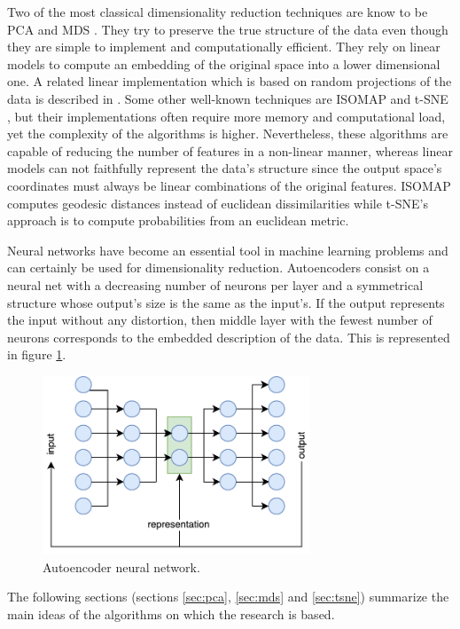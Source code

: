 \documentclass[a4paper,11pt,spanish]{report}
\begin{document}
Two of the most classical dimensionality reduction techniques are know to be PCA \citep{pca} and MDS \citep{mds}. They try to preserve the true structure of the data even though they are simple to implement and computationally efficient. They rely on linear models to compute an embedding of the original space into a lower dimensional one. A related linear implementation which is based on random projections of the data is described in \citep{rproj, rproj2}. Some other well-known techniques are ISOMAP \citep{isomap} and t-SNE \citep{tsne}, but their implementations often require more memory and computational load, yet the complexity of the algorithms is higher. Nevertheless, these algorithms are capable of reducing the number of features in a non-linear manner, whereas linear models can not faithfully represent the data's structure since the output space's coordinates must always be linear combinations of the original features. ISOMAP computes geodesic distances instead of euclidean dissimilarities while t-SNE's approach is to compute probabilities from an euclidean metric.

Neural networks have become an essential tool in machine learning problems and can certainly be used for dimensionality reduction. Autoencoders \citep{auto2, auto} consist on a neural net with a  decreasing number of neurons per layer and a symmetrical structure whose output's size is the same as the input's. If the output represents the input without any distortion, then middle layer with the fewest number of neurons corresponds to the embedded description of the data. This is represented in figure \ref{autoencoder}.

\begin{figure}[h]
\centering
\includegraphics[width=8cm]{figures/autoencoder.pdf}
\caption{\label{autoencoder}Autoencoder neural network.}
\end{figure}

The following sections (sections \ref{sec:pca}, \ref{sec:mds} and \ref{sec:tsne}) summarize the main ideas of the algorithms on which the research is based. 
\end{document}

